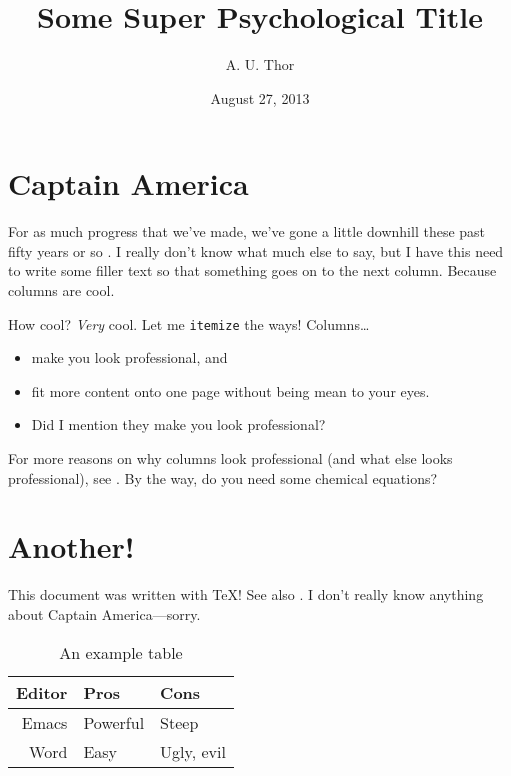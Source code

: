 \documentclass{smcm-psyc-paper}
\title{Some Super Psychological Title}
\author{A. U. Thor}
\affil{St. Mary's College of Maryland}
\date{August 27, 2013}
\begin{document}
\maketitle

\section{Captain America}
For as much progress that we've made,
  we've gone a little downhill
  these past fifty years or so \autocite{rogers:elements}.
I really don't know what much else to say,
  but I have this need to write some filler text
  so that something goes on to the next column.
Because columns are cool.

How cool?
\emph{Very} cool.
Let me \texttt{itemize} the ways!
Columns\dots
\begin{itemize}
\item make you look professional, and
\item fit more content onto one page without being mean to your eyes.
\item Did I mention they make you look professional?
\end{itemize}

For more reasons on why columns look professional
  (and what else looks professional),
  see \cite{compandtype}.
By the way, do you need some chemical equations?


\section{Another!}
This document was written with \TeX! See also \cite{texbook}.
I don't really know anything about Captain America---sorry.

\begin{table}
  \centering
  \begin{tabular}{rll}
    \toprule
    Editor & Pros & Cons \\
    \midrule
    Emacs & Powerful & Steep \\
    Word  & Easy & Ugly, evil \\
    \bottomrule
  \end{tabular}
  \caption{An example table}
  \label{tab:ex}
\end{table}

\printbibliography
\end{document}
